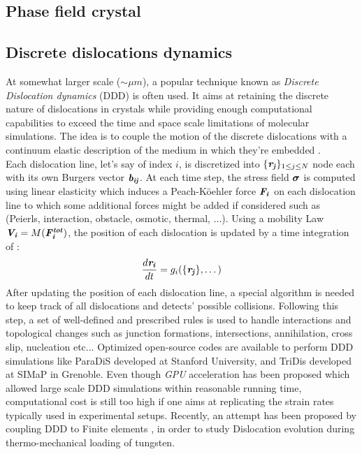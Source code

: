 \documentclass{article}
\begin{document}
\subsection{Phase field crystal}
\subsection{Discrete dislocations dynamics}
At somewhat larger scale ($\sim \mu m$), a popular technique known as \emph{Discrete Dislocation dynamics} (DDD) \parencite{devincreThreeDimensionalSimulations1992} \parencite{kubinmodellingdislocation1992} is often used. It aims at retaining the discrete nature of dislocations in crystals while providing enough computational capabilities to exceed the time and space scale limitations of molecular simulations. The idea is to couple the motion of the discrete dislocations with a continuum elastic description of the medium in which they're embedded \parencite{bulatovComputerSimulations2006}.\\


Each dislocation line, let's say of index $i$, is discretized into $\lbrace\bm{\mathit{r_j}}\rbrace_{1\leq j \leq N}$ node each with its own Burgers vector ${\bm{\mathit{b_{ij}}}}$. At each time step, the stress field $\bm{\mathit{\sigma}}$ is computed using linear elasticity which induces a Peach-Köehler force $\bm{\mathit{F_i}}$ on each dislocation line to which some additional forces might be added if considered such as (Peierls, interaction, obstacle, osmotic, thermal, $\dots$). Using a mobility Law $\bm{\mathit{V_i}}=M(\bm{\mathit{F_i^{tot}}})$, the position of each dislocation is updated by a time integration of :
\begin{equation}
    \frac{d \bm{\mathit{r_i}}}{dt} = g_i(\lbrace\bm{\mathit{r_j}}\rbrace,\dots)
\end{equation}
After updating the position of each dislocation line, a special algorithm is needed to keep track of all dislocations and detects' possible collisions. Following this step, a set of well-defined and prescribed rules is used to handle interactions and topological changes such as junction formations, intersections, annihilation, cross slip, nucleation etc... Optimized open-source codes are available to perform DDD simulations like ParaDiS \parencite{paradis} developed at Stanford University, and TriDis \parencite{tridis} developed at SIMaP in Grenoble. Even though \emph{GPU} acceleration has been proposed \parencite{bertinGPUaccelerateddislocation2019} which allowed large scale DDD simulations within reasonable running time, computational cost is still too high if one aims at replicating the strain rates typically used in experimental setups. Recently, an attempt has been proposed by coupling DDD to Finite elements \parencite{cuiDislocationevolution2021}, in order to study Dislocation evolution during thermo-mechanical loading of tungsten.
\end{document}
